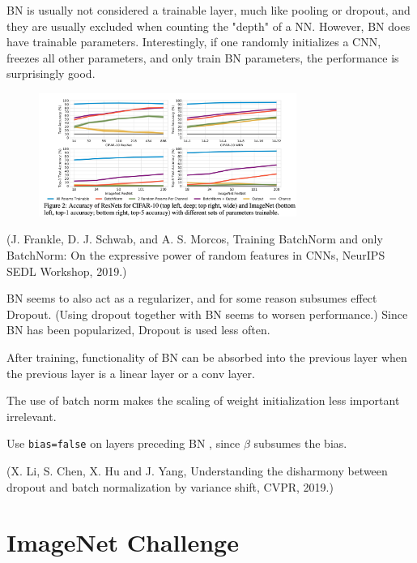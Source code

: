 \documentclass{report}
\begin{document}
\begin{concept}
    BN is usually not considered a trainable layer, much like pooling or dropout, and they are usually excluded when counting the "depth" of a NN. However, BN does have trainable parameters. Interestingly, if one randomly initializes a CNN, freezes all other parameters, and only train BN parameters, the performance is surprisingly good.

    \begin{figure}[H]
        \centering
        \includegraphics[width=0.75\textwidth]{.././assets/6.14.png}
    \end{figure}

    (J. Frankle, D. J. Schwab, and A. S. Morcos, Training BatchNorm and only BatchNorm: On the expressive power of random features in CNNs, NeurIPS SEDL Workshop, 2019.)
\end{concept}

\begin{concept}[6.51][Discussion of BN]
    BN seems to also act as a regularizer, and for some reason subsumes effect Dropout. (Using dropout together with BN seems to worsen performance.) Since BN has been popularized, Dropout is used less often.

    After training, functionality of BN can be absorbed into the previous layer when the previous layer is a linear layer or a conv layer.

    The use of batch norm makes the scaling of weight initialization less important irrelevant.

    Use \texttt{bias=false} on layers preceding BN , since $\beta$ subsumes the bias.

    (X. Li, S. Chen, X. Hu and J. Yang, Understanding the disharmony between dropout and batch normalization by variance shift, CVPR, 2019.)
\end{concept}

\chapter{ImageNet Challenge}
\end{document}
